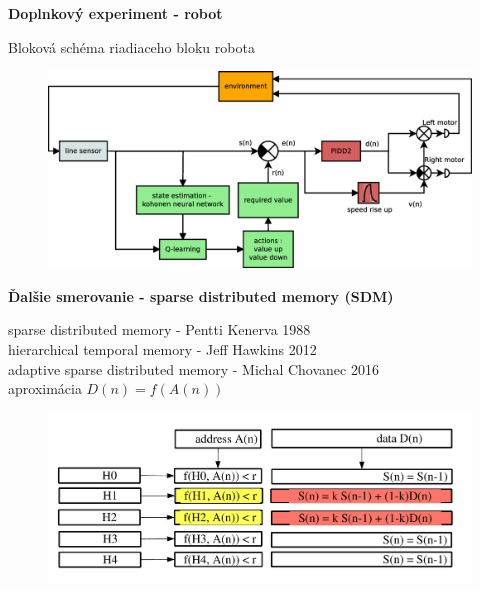 \documentclass[xcolor=dvipsnames]{beamer}
\begin{document}
\begin{frame}{\bf Doplnkový experiment - robot}

Bloková schéma riadiaceho bloku robota

\begin{figure}[!htb]
\centering
\includegraphics[scale=.2]{../diagrams/motoko_robot_block.eps}
\label{img:motoko_robot_block}
\end{figure}

\end{frame}

\begin{frame}{\bf Ďalšie smerovanie - sparse distributed memory (SDM)}

sparse distributed memory - Pentti Kenerva 1988 \\
hierarchical temporal memory - Jeff Hawkins 2012 \\
adaptive sparse distributed memory - Michal Chovanec 2016 \\
\bigskip
aproximácia
$D(n) = f( A(n) )$
\begin{figure}[!htb]
\centering
\includegraphics[scale=.4]{../pictures/sdm.pdf}
\label{img:motoko_robot_block}
\end{figure}
\end{frame}
\end{document}
